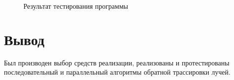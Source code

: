 \begin{figure}[h!]
	
	
	\caption{Результат тестирования программы}
	
	\label{fig:work_example}
	
\end{figure}


\section*{Вывод}

Был производен выбор средств реализации, реализованы и протестированы последовательный и параллельный алгоритмы обратной трассировки лучей.
